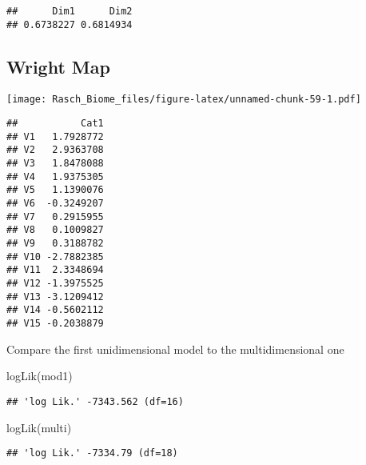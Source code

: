 \documentclass[
]{book}
\newenvironment{Shaded}{\begin{snugshade}}{\end{snugshade}}
\newcommand{\CommentTok}[1]{\textcolor[rgb]{0.56,0.35,0.01}{\textit{#1}}}
\newcommand{\FunctionTok}[1]{\textcolor[rgb]{0.00,0.00,0.00}{#1}}
\newcommand{\NormalTok}[1]{#1}
\newcommand{\OtherTok}[1]{\textcolor[rgb]{0.56,0.35,0.01}{#1}}
\newcommand{\SpecialCharTok}[1]{\textcolor[rgb]{0.00,0.00,0.00}{#1}}
\begin{document}
\begin{verbatim}
##      Dim1      Dim2 
## 0.6738227 0.6814934
\end{verbatim}

\hypertarget{wright-map-2}{%
\subsection{Wright Map}\label{wright-map-2}}

\begin{Shaded}
\end{Shaded}

\texttt{[image: Rasch\_Biome\_files/figure-latex/unnamed-chunk-59-1.pdf]}

\begin{verbatim}
##           Cat1
## V1   1.7928772
## V2   2.9363708
## V3   1.8478088
## V4   1.9375305
## V5   1.1390076
## V6  -0.3249207
## V7   0.2915955
## V8   0.1009827
## V9   0.3188782
## V10 -2.7882385
## V11  2.3348694
## V12 -1.3975525
## V13 -3.1209412
## V14 -0.5602112
## V15 -0.2038879
\end{verbatim}

Compare the first unidimensional model to the multidimensional one

\begin{Shaded}
\begin{Highlighting}[]
\FunctionTok{logLik}\NormalTok{(mod1)}
\end{Highlighting}
\end{Shaded}

\begin{verbatim}
## 'log Lik.' -7343.562 (df=16)
\end{verbatim}

\begin{Shaded}
\begin{Highlighting}[]
\FunctionTok{logLik}\NormalTok{(multi)}
\end{Highlighting}
\end{Shaded}

\begin{verbatim}
## 'log Lik.' -7334.79 (df=18)
\end{verbatim}
\end{document}
